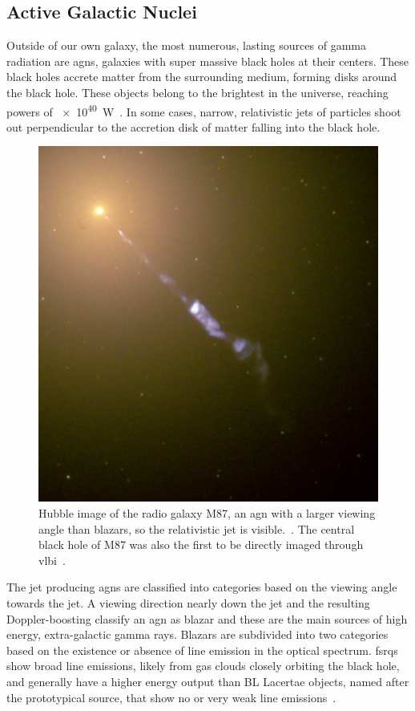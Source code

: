 \subsection{Active Galactic Nuclei}\label{sec:agn}
Outside of our own galaxy, the most numerous, lasting sources
of gamma radiation are \glspl{agn}, galaxies with super massive black holes at their centers.
These black holes accrete matter from the surrounding medium,
forming disks around the black hole.
These objects belong to the brightest in the universe, reaching powers
of \SI{e40}{\watt}~\cite{app-angelis}.
In some cases, narrow, relativistic jets of particles shoot out perpendicular to the accretion disk of matter falling into the black hole.
\begin{figure}
  \includegraphics[width=\linewidth]{images/m87.jpg}
  \caption{%
    Hubble image of the radio galaxy M87, an \gls{agn} with
    a larger viewing angle than blazars, so the relativistic jet is visible.~\cite{hubble-m87}.
    The central black hole of M87 was also the first to be directly imaged through
    \gls{vlbi}~\cite{m87-bh}.
  }\label{fig:m87}
\end{figure}

The jet producing \glspl{agn} are classified into categories based on the viewing angle
towards the jet.
A viewing direction nearly down the jet and the resulting Doppler-boosting classify an \gls{agn} as blazar
and these are the main sources of high energy, extra-galactic gamma rays.
Blazars are subdivided into two categories based on the existence
or absence of line emission in the optical spectrum.
\glspl{fsrq} show broad line emissions, likely from gas clouds closely orbiting the black hole, and generally have a higher energy output than
BL Lacertae objects, named after the prototypical source, 
that show no or very weak line emissions~\cite{fromblazars}.

